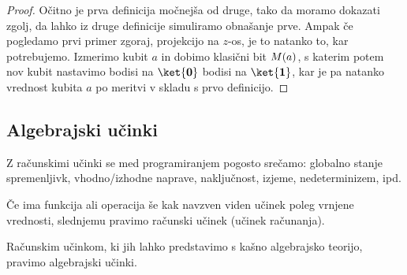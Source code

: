 \begin{proof}
    Očitno je prva definicija močnejša od druge, tako da moramo dokazati zgolj, da lahko iz druge definicije simuliramo obnašanje prve.
    Ampak če pogledamo prvi primer zgoraj, projekcijo na \(z\)-os, je to natanko to, kar potrebujemo. Izmerimo kubit \(a\) in dobimo klasični bit \(M{\left( {a} \right)}\), s katerim potem nov kubit nastavimo bodisi na \(\ket{\mb0}\) bodisi na \(\ket{\mb1}\), kar je pa natanko vrednost kubita \(a\) po meritvi v skladu s prvo definicijo.
\end{proof}

\subsection{Algebrajski učinki}

Z računskimi učinki se med programiranjem pogosto srečamo: globalno stanje spremenljivk, vhodno/izhodne naprave, naključnost, izjeme, nedeterminizem, ipd.

\begin{definition}
    Če ima funkcija ali operacija še kak navzven viden učinek poleg vrnjene vrednosti, slednjemu pravimo računski učinek (učinek računanja).
\end{definition}

\begin{definition}
    Računskim učinkom, ki jih lahko predstavimo s kašno algebrajsko teorijo, pravimo algebrajski učinki.
\end{definition}